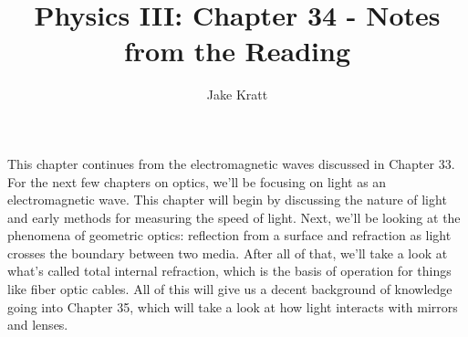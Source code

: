 \documentclass[12pt, letterpaper]{article}
\title{Physics III: Chapter 34 - Notes from the Reading}
\author{Jake Kratt}
\begin{document}
\maketitle

This chapter continues from the electromagnetic waves discussed in Chapter 33. For the next few chapters on optics, we'll be focusing on light as an electromagnetic wave. This chapter will begin by discussing the nature of light and early methods for measuring the speed of light. Next, we'll be looking at the phenomena of geometric optics: reflection from a surface and refraction as light crosses the boundary between two media. After all of that, we'll take a look at what's called total internal refraction, which is the basis of operation for things like fiber optic cables. All of this will give us a decent background of knowledge going into Chapter 35, which will take a look at how light interacts with mirrors and lenses.
\end{document}
